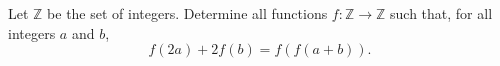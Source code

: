 Let $\mathbb{Z}$ be the set of integers. Determine all functions $f: \mathbb{Z} \rightarrow \mathbb{Z}$ such that, for all integers $a$ and $b$, $$f(2a)+2f(b)=f(f(a+b)).$$